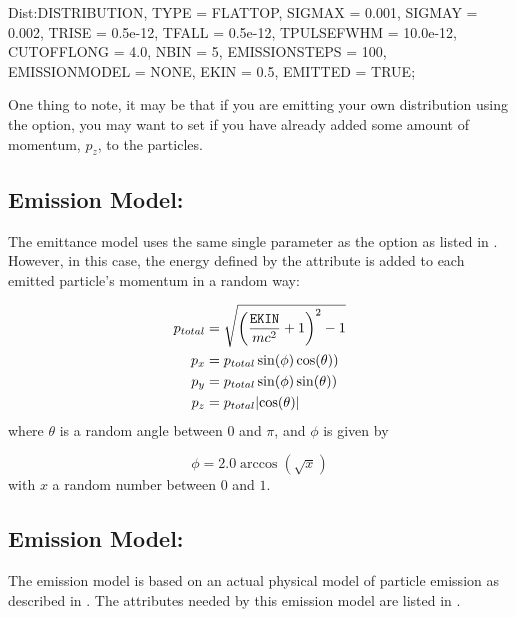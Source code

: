 \begin{example}
Dist:DISTRIBUTION, TYPE = FLATTOP,
                   SIGMAX = 0.001,
                   SIGMAY = 0.002,
                   TRISE = 0.5e-12,
                   TFALL = 0.5e-12,
                   TPULSEFWHM = 10.0e-12,
                   CUTOFFLONG = 4.0,
                   NBIN = 5,
                   EMISSIONSTEPS = 100,
                   EMISSIONMODEL = NONE,
                   EKIN = 0.5,
                   EMITTED = TRUE;
\end{example}

One thing to note, it may be that if you are emitting your own distribution using the 
option, you may want to set  if you have already added some amount of momentum, $p_{z}$, to the
particles.

\subsection{Emission Model: }
The  emittance model uses the same single parameter as the  option as listed in
. However, in this case, the energy defined by the  attribute is
added to each emitted particle's momentum in a random way:

\begin{equation*}
  \begin{aligned}
    p_{total} &= \sqrt{\left(\frac{\keyword{EKIN}}{mc^{2}} + 1\right)^{2} - 1} \\
    p_{x} &= p_{total} \sin(\phi) \cos(\theta)) \\
    p_{y} &= p_{total} \sin(\phi) \sin(\theta)) \\
    p_{z} &= p_{total} |{\cos(\theta)}|
  \end{aligned}
\end{equation*}
where $\theta$ is a random angle between $0$ and $\pi$, and $\phi$ is given by

\begin{equation*}
  \phi = 2.0 \arccos \left( \sqrt{x} \right)
\end{equation*}
with $x$ a random number between $0$ and $1$.

\subsection{Emission Model: }
The  emission model is based on an actual physical model of particle emission as described in
\cite{flo:97, clen:2000, dowe:2009}. The attributes needed by this emission model are listed in
.

